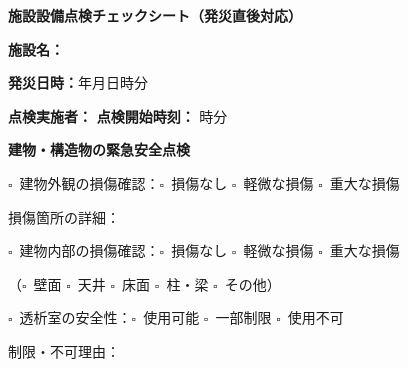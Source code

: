 \documentclass[a4paper,12pt]{jarticle}
\newcommand{\checkbox}{$\square$\ }
\newcommand{\underlinespace}[1]{\underline{\hspace{#1}}}
\begin{document}
\begin{center}
{\Large\textbf{施設設備点検チェックシート（発災直後対応）}}
\end{center}
\vspace{5mm}

\noindent
\textbf{施設名：} \underlinespace{8cm}

\vspace{3mm}

\noindent
\textbf{発災日時：}\underlinespace{2cm}年\underlinespace{1cm}月\underlinespace{1cm}日\underlinespace{1cm}時\underlinespace{1cm}分

\vspace{3mm}

\noindent
\textbf{点検実施者：} \underlinespace{4cm} \quad \textbf{点検開始時刻：} \underlinespace{1cm}時\underlinespace{1cm}分

\vspace{8mm}

\begin{center}
\textbf{\large 建物・構造物の緊急安全点検}
\end{center}

\vspace{3mm}

\noindent
\checkbox 建物外観の損傷確認：\checkbox 損傷なし \quad \checkbox 軽微な損傷 \quad \checkbox 重大な損傷

\vspace{2mm}

\noindent
損傷箇所の詳細：\underlinespace{10cm}

\vspace{3mm}

\noindent
\checkbox 建物内部の損傷確認：\checkbox 損傷なし \quad \checkbox 軽微な損傷 \quad \checkbox 重大な損傷

\vspace{2mm}

\noindent
（\checkbox 壁面 \quad \checkbox 天井 \quad \checkbox 床面 \quad \checkbox 柱・梁 \quad \checkbox その他）

\vspace{3mm}

\noindent
\checkbox 透析室の安全性：\checkbox 使用可能 \quad \checkbox 一部制限 \quad \checkbox 使用不可

\vspace{2mm}

\noindent
制限・不可理由：\underlinespace{10cm}

\vspace{3mm}
\end{document}

